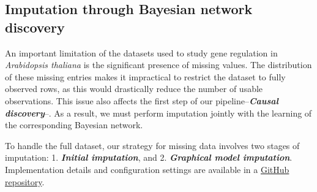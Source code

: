 \documentclass[
]{article}
\theoremstyle{definition}
\theoremstyle{remark}
\begin{document}
\subsection{Imputation through Bayesian network
discovery}\label{sec-imputation}

An important limitation of the datasets used to study gene regulation in
\emph{Arabidopsis thaliana} is the significant presence of missing
values. The distribution of these missing entries makes it impractical
to restrict the dataset to fully observed rows, as this would
drastically reduce the number of usable observations. This issue also
affects the first step of our pipeline--\textbf{\emph{Causal
discovery}}--. As a result, we must perform imputation jointly with the
learning of the corresponding Bayesian network.

To handle the full dataset, our strategy for missing data involves two
stages of imputation: 1. \textbf{\emph{Initial imputation}}, and 2.
\textbf{\emph{Graphical model imputation}}. Implementation details and
configuration settings are available in a
\href{https://github.com/rmartosprieto/chloroDAG.git}{GitHub
repository}.
\end{document}
